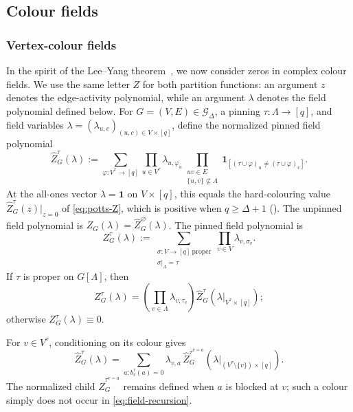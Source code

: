 \documentclass[11pt,reqno]{article}
\theoremstyle{plain}
\theoremstyle{definition}
\theoremstyle{remark}
\theoremstyle{definition}
\theoremstyle{remark}
\newcommand{\one}[1]{\mathbf{1}_{\left[#1\right]}}   %
\newcommand{\Deg}{\Delta}                        %
\newcommand{\Zpart}{Z}                           %
\newcommand{\colours}{[q]}                        %
\newcommand{\bcount}{b}
\newcommand{\Gdeg}{\mathcal{G}_{\Deg}}
\newcommand{\Zpin}[2]{Z_{#1}^{#2}}
\newcommand{\nZpin}[2]{\widehat Z_{#1}^{#2}}
\begin{document}
\subsection{Colour fields}
\label{sec:lee-yang}

\subsubsection{Vertex-colour fields}

In the spirit of the Lee--Yang theorem~\cite{LeeYang1952}, we now
consider zeros in complex colour fields.
We use the same letter \(Z\) for both partition functions: an argument
\(z\) denotes the edge-activity polynomial, while an argument \(\lambda\)
denotes the field polynomial defined below.
For \(G=(V,E)\in\Gdeg\), a pinning \(\tau\colon\Lambda\to\colours\), and field
variables \(\lambda=(\lambda_{u,c})_{(u,c)\in V\times\colours}\),
define the normalized pinned field
polynomial
\begin{equation}\label{eq:field-Z}
  \nZpin{G}{\tau}(\lambda)
  :=\sum_{\varphi\colon V^\tau\to\colours}
     \prod_{u\in V^\tau}\lambda_{u,\varphi_u}
     \prod_{\substack{uv\in E\\\{u,v\}\not\subseteq\Lambda}}
       \one{(\tau\cup\varphi)_u\ne(\tau\cup\varphi)_v}.
\end{equation}
At the all-ones vector \(\lambda=\mathbf1\) on \(V\times\colours\), this
equals the hard-colouring value \(\nZpin{G}{\tau}(z)|_{z=0}\) of
\eqref{eq:potts-Z}, which is positive when \(q\ge\Deg+1\)
().  The unpinned field
polynomial is \(\Zpart_G(\lambda)=\nZpin{G}{\varnothing}(\lambda)\).
The pinned field polynomial is
\[
  \Zpin{G}{\tau}(\lambda)
  :=\sum_{\substack{\sigma\colon V\to\colours\ \mathrm{proper}\\
                    \sigma|_\Lambda=\tau}}
       \prod_{v\in V}\lambda_{v,\sigma_v}.
\]
If \(\tau\) is proper on \(G[\Lambda]\), then
\begin{equation}\label{eq:full-field-normalization}
  \Zpin{G}{\tau}(\lambda)
  =\left(\prod_{v\in\Lambda}\lambda_{v,\tau_v}\right)
   \nZpin{G}{\tau}(\lambda|_{V^\tau\times\colours});
\end{equation}
otherwise \(\Zpin{G}{\tau}(\lambda)\equiv0\).

For \(v\in V^\tau\), conditioning on its colour gives
\begin{equation}\label{eq:field-recursion}
  \nZpin{G}{\tau}(\lambda)
  =\sum_{a:\bcount_v^\tau(a)=0}
     \lambda_{v,a}\,
     \nZpin{G}{\tau^{v=a}}
       (\lambda|_{(V^\tau\setminus\{v\})\times\colours}).
\end{equation}
The normalized child \(\nZpin{G}{\tau^{v=a}}\) remains defined when \(a\)
is blocked at \(v\);
such a colour simply does not occur in \eqref{eq:field-recursion}.
\end{document}
